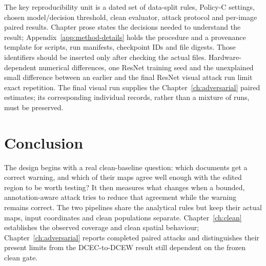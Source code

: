 The key reproducibility unit is a dated set of data-split rules, Policy-C settings, chosen model/decision threshold, clean evaluator, attack protocol and per-image paired results. Chapter prose states the decisions needed to understand the result; Appendix~\ref{app:method-details} holds the procedure and a provenance template for scripts, run manifests, checkpoint IDs and file digests. Those identifiers should be inserted only after checking the actual files. Hardware-dependent numerical differences, one ResNet training seed and the unexplained small difference between an earlier and the final ResNet visual attack run limit exact repetition. The final visual run supplies the Chapter~\ref{ch:adversarial} paired estimates; its corresponding individual records, rather than a mixture of runs, must be preserved.

\section{Conclusion}
\label{sec:method-conclusion}

The design begins with a real clean-baseline question: which documents get a correct warning, and which of their maps agree well enough with the edited region to be worth testing? It then measures what changes when a bounded, annotation-aware attack tries to reduce that agreement while the warning remains correct. The two pipelines share the analytical rules but keep their actual maps, input coordinates and clean populations separate. Chapter~\ref{ch:clean} establishes the observed coverage and clean spatial behaviour; Chapter~\ref{ch:adversarial} reports completed paired attacks and distinguishes their present limits from the DCEC-to-DCEW result still dependent on the frozen clean gate.